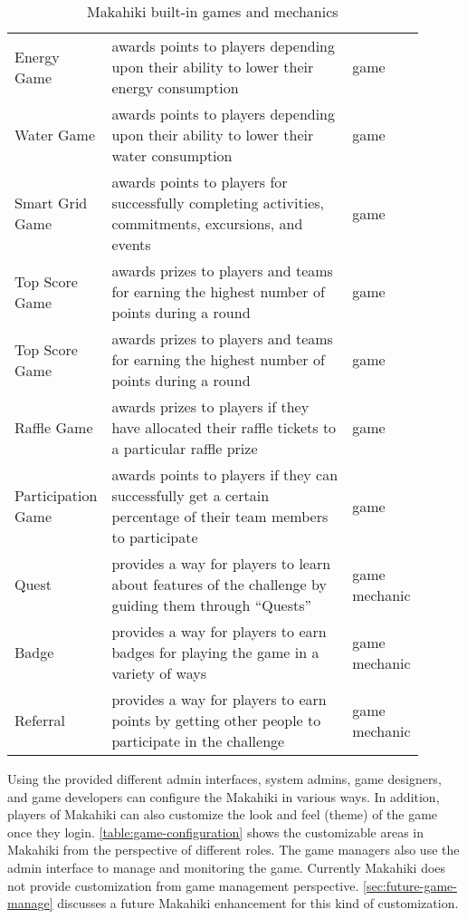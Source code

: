 \begin{table}[ht!]
  \centering
  \begin{tabular} {|P{0.2\linewidth}|P{0.6\linewidth}|P{0.1\linewidth}|}
    \hline
     &
     &
     \\
    \hline
    Energy Game & awards points to players depending upon their ability to lower their energy consumption & game \\
    \hline
    Water Game & awards points to players depending upon their ability to lower their water consumption & game \\
    \hline
    Smart Grid Game & awards points to players for successfully completing activities, commitments, excursions, and events & game \\
    \hline
    Top Score Game & awards prizes to players and teams for earning the highest number of points during a round & game \\
    \hline
    Top Score Game & awards prizes to players and teams for earning the highest number of points during a round & game \\
    \hline
    Raffle Game & awards prizes to players if they have allocated their raffle tickets to a particular raffle prize & game \\
    \hline
    Participation Game & awards points to players if they can successfully get a certain percentage of their team members to participate & game \\
    \hline
    Quest & provides a way for players to learn about features of the challenge by guiding them through ``Quests'' & game mechanic\\
    \hline
    Badge & provides a way for players to earn badges for playing the game in a variety of ways & game mechanic\\
    \hline
    Referral & provides a way for players to earn points by getting other people to participate in the challenge & game mechanic\\
    \hline
  \end{tabular}
  \caption{Makahiki built-in games and mechanics}
  \label{table:makahiki-games}
\end{table}

Using the provided different admin interfaces, system admins, game designers, and game developers can configure the Makahiki in various ways. In addition, players of Makahiki can also customize the look and feel (theme) of the game once they login. \autoref{table:game-configuration} shows the customizable areas in Makahiki from the perspective of different roles. The game managers also use the admin interface to manage and monitoring the game. Currently Makahiki does not provide customization from game management perspective. \autoref{sec:future-game-manage} discusses a future Makahiki enhancement for this kind of customization.

